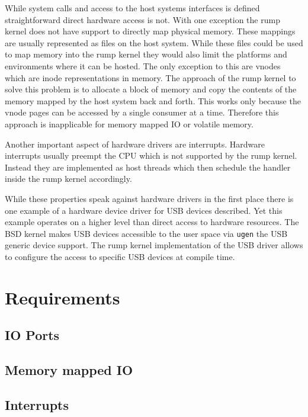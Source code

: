 \documentclass[
a4paper,
12pt,
notitlepage,
parskip=half,
DIV=11,
]{scrbook}
\begin{document}
		While system calls and access to the host systems interfaces is defined straightforward direct hardware access is not.
		With one exception the rump kernel does not have support to directly map physical memory.
		These mappings are usually represented as files on the host system.
		While these files could be used to map memory into the rump kernel they would also limit the platforms and environments where it can be hosted.
		The only exception to this are vnodes which are inode representations in memory.
		The approach of the rump kernel to solve this problem is to allocate a block of memory and copy the contents of the memory mapped by the host system back and forth.
		This works only because the vnode pages can be accessed by a single consumer at a time.
		Therefore this approach is inapplicable for memory mapped IO or volatile memory. \citep{kantee}
		
		Another important aspect of hardware drivers are interrupts.
		Hardware interrupts usually preempt the CPU which is not supported by the rump kernel.
		Instead they are implemented as host threads which then schedule the handler inside the rump kernel accordingly. \citep{kantee}
		
		While these properties speak against hardware drivers in the first place there is one example of a hardware device driver for USB devices described.
		Yet this example operates on a higher level than direct access to hardware resources.
		The BSD kernel makes USB devices accessible to the user space via \texttt{ugen} the USB generic device support.
		The rump kernel implementation of the USB driver allows to configure the access to specific USB devices at compile time. \citep{kantee} \citep{ugen}
		
	\chapter{Requirements} %
	
	\section{IO Ports}
	
	\section{Memory mapped IO}
	
	\section{Interrupts}
	
\end{document}
